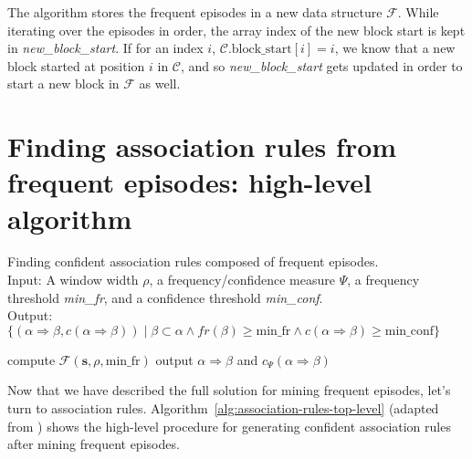 The algorithm stores the frequent episodes in a new data structure $ \mathcal{F} $. While iterating over the episodes in order, the array index of the new block start is kept in \emph{new\_block\_start}. If for an index $ i $, $ \mathcal{C}. \text{block\_start}[i] = i $, we know that a new block started at position $ i $ in $ \mathcal{C} $, and so \emph{new\_block\_start} gets updated in order to start a new block in $ \mathcal{F} $ as well.



\section{Finding association rules from frequent episodes: high-level algorithm}

\begin{algorithm}

\caption{Finding confident association rules composed of frequent episodes.\\
Input: A window width $ \rho $, a frequency/confidence measure $ \Psi $, a frequency threshold \emph{min\_fr}, and a confidence threshold \emph{min\_conf}.\\
Output: $ \{ (\alpha \Rightarrow \beta, c(\alpha \Rightarrow \beta)) \mid \beta \subset \alpha \wedge fr(\beta) \geq \text{min\_fr} \wedge c(\alpha \Rightarrow \beta) \geq \text{min\_conf} \} $
}

\begin{algorithmic}[1]

\State compute $ \mathcal{F}(\boldsymbol{s}, \rho, \text{min\_fr}) $
    \ForAll{$ \alpha \subset \beta $}
         \label{alglin:association-rules-top-level:compute-confidence}
            \State output $ \alpha \Rightarrow \beta $ and $ c_\Psi(\alpha \Rightarrow \beta) $
        \EndIf
    \EndFor
\EndFor

\end{algorithmic}

\label{alg:association-rules-top-level}
\end{algorithm}

Now that we have described the full solution for mining frequent episodes, let's turn to association rules. Algorithm~\ref{alg:association-rules-top-level} (adapted from \citep{mannila1997discovery}) shows the high-level procedure for generating confident association rules after mining frequent episodes.

